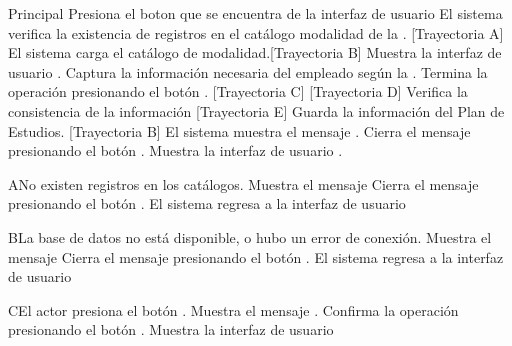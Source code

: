 \begin{UCtrayectoria}{Principal}
    \UCpaso[\UCactor] Presiona el boton \IUbutton{+} que se encuentra de la interfaz de usuario 
	\UCpaso  El sistema verifica la existencia de registros en el catálogo modalidad de la  . [Trayectoria A] 
    \UCpaso El sistema carga el catálogo de modalidad.[Trayectoria B]
    \UCpaso Muestra la interfaz de usuario .
    \UCpaso[\UCactor] Captura la información necesaria del empleado según la .
    \UCpaso[\UCactor] Termina la operación presionando el botón . [Trayectoria C] [Trayectoria D]
    \UCpaso Verifica la consistencia de la información [Trayectoria E]
    \UCpaso Guarda la información del Plan de Estudios. [Trayectoria B]
    \UCpaso El sistema muestra el mensaje .
    \UCpaso[\UCactor] Cierra el mensaje presionando el botón .
    \UCpaso Muestra la interfaz de usuario .
\end{UCtrayectoria}


\begin{UCtrayectoriaA}{A}{No existen registros en los catálogos.}
	\UCpaso Muestra el mensaje 
	\UCpaso[\UCactor] Cierra el mensaje presionando el botón .
	\UCpaso El sistema regresa a la interfaz de usuario 
\end{UCtrayectoriaA}

\begin{UCtrayectoriaA}{B}{La base de datos no está disponible, o hubo un error de conexión.}
	\UCpaso Muestra el mensaje 
	\UCpaso[\UCactor] Cierra el mensaje presionando el botón .
    \UCpaso El sistema regresa a la interfaz de usuario 
\end{UCtrayectoriaA}

\begin{UCtrayectoriaA}{C}{El actor presiona el botón .}
	\UCpaso Muestra el mensaje .
	\UCpaso[\UCactor] Confirma la operación presionando el botón .
	\UCpaso Muestra la interfaz de usuario 
\end{UCtrayectoriaA}

